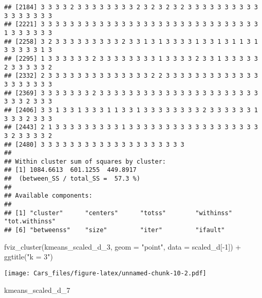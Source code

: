 \documentclass[
]{article}
\newenvironment{Shaded}{\begin{snugshade}}{\end{snugshade}}
\newcommand{\AttributeTok}[1]{\textcolor[rgb]{0.77,0.63,0.00}{#1}}
\newcommand{\DecValTok}[1]{\textcolor[rgb]{0.00,0.00,0.81}{#1}}
\newcommand{\FunctionTok}[1]{\textcolor[rgb]{0.00,0.00,0.00}{#1}}
\newcommand{\NormalTok}[1]{#1}
\newcommand{\SpecialCharTok}[1]{\textcolor[rgb]{0.00,0.00,0.00}{#1}}
\newcommand{\StringTok}[1]{\textcolor[rgb]{0.31,0.60,0.02}{#1}}
\begin{document}
\begin{verbatim}
## [2184] 3 3 3 3 2 3 3 3 3 3 3 3 3 2 3 2 3 2 3 2 3 3 3 3 3 3 3 3 3 3 3 3 3 3 3 3 3
## [2221] 3 3 3 3 3 3 3 3 3 3 3 3 3 3 3 3 3 3 3 3 3 3 3 3 3 3 3 3 3 3 1 3 3 3 3 3 3
## [2258] 3 2 3 3 3 3 3 3 3 3 3 2 3 3 1 3 1 3 3 3 3 1 3 3 1 3 1 1 3 1 3 3 3 3 3 1 3
## [2295] 1 3 3 3 3 3 3 2 3 3 3 3 3 3 3 3 1 3 3 3 3 2 3 3 1 3 3 3 3 3 2 3 3 3 3 3 2
## [2332] 2 3 3 3 3 3 3 3 3 3 3 3 3 3 3 2 2 3 3 3 3 3 3 3 3 3 3 3 3 3 3 3 3 3 3 3 3
## [2369] 3 3 3 3 3 3 3 2 3 3 3 3 3 3 3 3 3 3 3 3 3 3 3 3 3 3 3 3 3 3 3 3 3 2 3 3 3
## [2406] 3 3 1 3 3 1 3 3 3 1 1 3 3 1 3 3 3 3 3 3 3 3 2 3 3 3 3 3 3 1 3 3 3 2 3 3 3
## [2443] 2 1 3 3 3 3 3 3 3 3 3 1 3 3 3 3 3 3 3 3 3 3 3 3 3 3 3 3 3 3 3 2 3 3 3 3 2
## [2480] 3 3 3 3 3 3 3 3 3 3 3 3 3 3 3 3 3 3 3 3
## 
## Within cluster sum of squares by cluster:
## [1] 1084.6613  601.1255  449.8917
##  (between_SS / total_SS =  57.3 %)
## 
## Available components:
## 
## [1] "cluster"      "centers"      "totss"        "withinss"     "tot.withinss"
## [6] "betweenss"    "size"         "iter"         "ifault"
\end{verbatim}

\begin{Shaded}
\begin{Highlighting}[]
\FunctionTok{fviz\_cluster}\NormalTok{(kmeans\_scaled\_d\_3, }\AttributeTok{geom =} \StringTok{"point"}\NormalTok{, }\AttributeTok{data =}\NormalTok{ scaled\_d[}\SpecialCharTok{{-}}\DecValTok{1}\NormalTok{]) }\SpecialCharTok{+} \FunctionTok{ggtitle}\NormalTok{(}\StringTok{"k = 3"}\NormalTok{)}
\end{Highlighting}
\end{Shaded}

\texttt{[image: Cars\_files/figure-latex/unnamed-chunk-10-2.pdf]}

\begin{Shaded}
\begin{Highlighting}[]
\NormalTok{kmeans\_scaled\_d\_7}
\end{Highlighting}
\end{Shaded}
\end{document}
